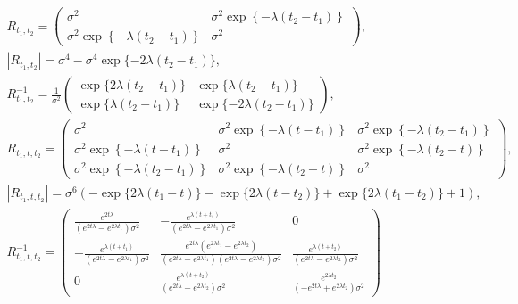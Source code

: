 \documentclass[12pt, a4paper]{article}
\begin{document}
\begin{gather*}
	R_{t_1,t_2} = 
		\begin{pmatrix}
			\sigma^2 & \sigma^2\exp\left\{-\lambda(t_2-t_1)\right\} \\
			\sigma^2\exp\left\{-\lambda(t_2-t_1)\right\} & \sigma^2
		\end{pmatrix}, \\
		\left| R_{t_1,t_2} \right| = \sigma^4 - \sigma^4\exp\{-2\lambda(t_2-t_1)\},\\
		R_{t_1,t_2}^{-1} = \frac 1{\sigma^2} 
		\begin{pmatrix}
			\exp\{2\lambda(t_2-t_1)\} & \exp\{\lambda(t_2-t_1)\} \\
			\exp\{\lambda(t_2-t_1)\} & \exp\{-2\lambda(t_2-t_1)\}
		\end{pmatrix},
\\
	R_{t_1,t,t_2} = \begin{pmatrix}
			\sigma^2 & \sigma^2\exp\left\{-\lambda(t-t_1)\right\} & \sigma^2\exp\left\{-\lambda(t_2-t_1)\right\} \\
			\sigma^2\exp\left\{-\lambda(t-t_1)\right\} & \sigma^2 & \sigma^2\exp\left\{-\lambda(t_2-t)\right\} \\
			\sigma^2\exp\left\{-\lambda(t_2-t_1)\right\} & \sigma^2\exp\left\{-\lambda(t_2-t)\right\} & \sigma^2
		\end{pmatrix}, \\
		\left| R_{t_1,t,t_2} \right| =
		\sigma^6\left(-\exp\{2 \lambda  \left(t_1-t\right)\}-\exp\{2 \lambda  \left(t-t_2\right)\}+\exp\{2 \lambda 
		   \left(t_1-t_2\right)\}+1\right),
\\
		R_{t_1,t,t_2}^{-1} = 
		\left(
		\begin{array}{ccc}
		 \frac{e^{2 t \lambda }}{\left(e^{2 t \lambda }-e^{2 \lambda  t_1}\right) \sigma ^2}
		   & -\frac{e^{\lambda  \left(t+t_1\right)}}{\left(e^{2 t \lambda }-e^{2 \lambda 
		   t_1}\right) \sigma ^2} & 0 \\
		 -\frac{e^{\lambda  \left(t+t_1\right)}}{\left(e^{2 t \lambda }-e^{2 \lambda 
		   t_1}\right) \sigma ^2} & \frac{e^{2 t \lambda } \left(e^{2 \lambda  t_1}-e^{2
		   \lambda  t_2}\right)}{\left(e^{2 t \lambda }-e^{2 \lambda  t_1}\right) \left(e^{2
		   t \lambda }-e^{2 \lambda  t_2}\right) \sigma ^2} & \frac{e^{\lambda 
		   \left(t+t_2\right)}}{\left(e^{2 t \lambda }-e^{2 \lambda  t_2}\right) \sigma ^2}
		   \\
		 0 & \frac{e^{\lambda  \left(t+t_2\right)}}{\left(e^{2 t \lambda }-e^{2 \lambda 
		   t_2}\right) \sigma ^2} & \frac{e^{2 \lambda  t_2}}{\left(-e^{2 t \lambda }+e^{2
		   \lambda  t_2}\right) \sigma ^2}
		\end{array}
		\right)
\end{gather*}
\end{document}
